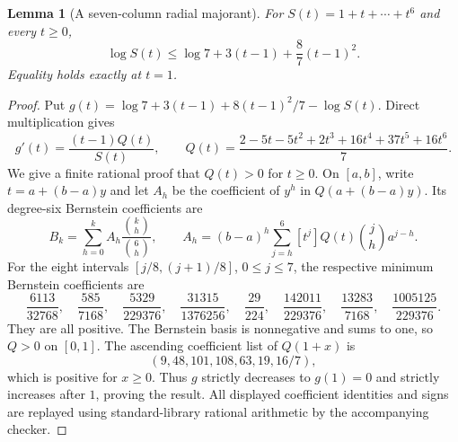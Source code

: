 \documentclass[11pt]{article}
\newtheorem{lemma}[theorem]{Lemma}
\theoremstyle{remark}
\numberwithin{equation}{section}
\begin{document}
\begin{lemma}[A seven-column radial majorant]
\label{lem:noorigin-oct7-radial-majorant}
For $S(t)=1+t+\cdots+t^6$ and every $t\ge0$,
\begin{equation}\label{eq:noorigin-oct7-radial-majorant}
 \log S(t)\le\log7+3(t-1)+\frac87(t-1)^2.
\end{equation}
Equality holds exactly at $t=1$.
\end{lemma}
\begin{proof}
Put $g(t)=\log7+3(t-1)+8(t-1)^2/7-\log S(t)$.
Direct multiplication gives
\[
 g'(t)=\frac{(t-1)Q(t)}{S(t)},\qquad
 Q(t)=\frac{2-5t-5t^2+2t^3+16t^4+37t^5+16t^6}{7}.
\]
We give a finite rational proof that $Q(t)>0$ for $t\ge0$.
On $[a,b]$, write $t=a+(b-a)y$ and let $A_h$ be the coefficient
of $y^h$ in $Q(a+(b-a)y)$. Its degree-six Bernstein coefficients are
\[
 B_k=\sum_{h=0}^k A_h\frac{\binom kh}{\binom6h},\qquad
 A_h=(b-a)^h\sum_{j=h}^6[t^j]Q(t)\binom jh a^{j-h}.
\]
For the eight intervals $[j/8,(j+1)/8]$, $0\le j\le7$,
the respective minimum Bernstein coefficients are
\[
 \frac{6113}{32768},\quad\frac{585}{7168},\quad
 \frac{5329}{229376},\quad\frac{31315}{1376256},\quad
 \frac{29}{224},\quad\frac{142011}{229376},\quad
 \frac{13283}{7168},\quad\frac{1005125}{229376}.
\]
They are all positive. The Bernstein basis is nonnegative and sums
to one, so $Q>0$ on $[0,1]$. The ascending coefficient list of
$Q(1+x)$ is
\[
       (9,48,101,108,63,19,16/7),
\]
which is positive for $x\ge0$. Thus $g$ strictly decreases to
$g(1)=0$ and strictly increases after $1$, proving the result.
All displayed coefficient identities and signs are replayed using
standard-library rational arithmetic by the accompanying checker.
\end{proof}
\end{document}
